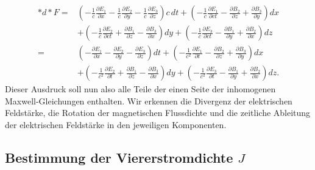 \begin{align*}
	\ast d {\ast} F = 
	&\left( -\frac{1}{c}\frac{\partial E_1}{\partial x} -\frac{1}{c}\frac{\partial E_2}{\partial y} - \frac{1}{c}\frac{\partial E_3}{\partial z} \right) c\,dt +
	\left(-\frac{1}{c}\frac{\partial E_1}{\partial ct} - \frac{\partial B_2}{\partial z} + \frac{\partial B_3}{\partial y} \right) dx\\
	& + \left( -\frac{1}{c}\frac{\partial E_2}{\partial ct} + \frac{\partial B_1}{\partial z} - \frac{\partial B_3}{\partial x} \right) dy +
	\left( -\frac{1}{c}\frac{\partial E_3}{\partial ct} - \frac{\partial B_1}{\partial y} + \frac{\partial B_2}{\partial x} \right) dz\\[2ex]
	=&\left( -\frac{\partial E_1}{\partial x} -\frac{\partial E_2}{\partial y} - \frac{\partial E_3}{\partial z} \right) dt +
	\left(-\frac{1}{c^2}\frac{\partial E_1}{\partial t} - \frac{\partial B_2}{\partial z} + \frac{\partial B_3}{\partial y} \right) dx\\
	& + \left( -\frac{1}{c^2}\frac{\partial E_2}{\partial t} + \frac{\partial B_1}{\partial z} - \frac{\partial B_3}{\partial x} \right) dy +
	\left( -\frac{1}{c^2}\frac{\partial E_3}{\partial t} - \frac{\partial B_1}{\partial y} + \frac{\partial B_2}{\partial x} \right) dz.
\end{align*}
Dieser Ausdruck soll nun also alle Teile der einen Seite der inhomogenen Maxwell-Gleichungen enthalten.
Wir erkennen die Divergenz der elektrischen Feldstärke, die Rotation der magnetischen Flussdichte und die zeitliche Ableitung der elektrischen Feldstärke in den jeweiligen Komponenten.
\subsection{Bestimmung der Viererstromdichte $J$}

